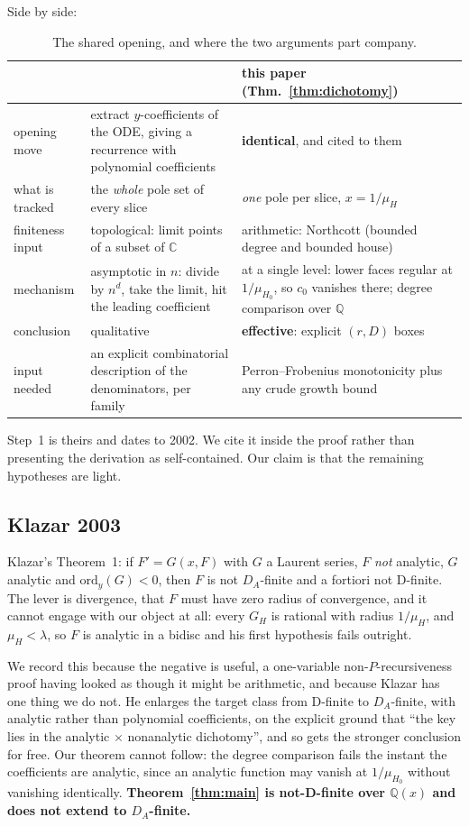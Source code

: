 \documentclass[11pt]{article}
\newcommand{\Q}{\mathbb{Q}}
\newcommand{\C}{\mathbb{C}}
\begin{document}
Side by side:

\begin{table}[H]
\centering\small
\begin{tabular}{p{} p{} p{}}
\toprule
 & \cite[Lemma~9]{bmr2002} & this paper (Thm.~\ref{thm:dichotomy}) \\
\midrule
opening move & extract $y$-coefficients of the ODE, giving a recurrence with polynomial coefficients & \textbf{identical}, and cited to them \\
what is tracked & the \emph{whole} pole set of every slice & \emph{one} pole per slice, $x = 1/\mu_H$ \\
finiteness input & topological: limit points of a subset of $\C$ & arithmetic: Northcott (bounded degree and bounded house) \\
mechanism & asymptotic in $n$: divide by $n^d$, take the limit, hit the leading coefficient & at a single level: lower faces regular at $1/\mu_{H_0}$, so $c_0$ vanishes there; degree comparison over $\Q$ \\
conclusion & qualitative & \textbf{effective}: explicit $(r,D)$ boxes \\
input needed & an explicit combinatorial description of the denominators, per family & Perron--Frobenius monotonicity plus any crude growth bound \\
\bottomrule
\end{tabular}
\caption{The shared opening, and where the two arguments part company.}
\label{tab:sidebyside}
\end{table}

Step~1 is theirs and dates to 2002. We cite it inside the proof rather than
presenting the derivation as self-contained. Our claim is that the remaining
hypotheses are light.

\subsection{Klazar 2003}

Klazar's Theorem~1: if $F' = G(x,F)$ with $G$ a Laurent series, $F$ \emph{not}
analytic, $G$ analytic and $\mathrm{ord}_y(G) < 0$, then $F$ is not $D_A$-finite
and a fortiori not D-finite. The lever is divergence, that $F$ must have zero
radius of convergence, and it cannot engage with our object at all: every
$G_H$ is rational with radius $1/\mu_H$, and $\mu_H < \lambda$, so $F$ is
analytic in a bidisc and his first hypothesis fails outright.

We record this because the negative is useful, a one-variable
non-$P$-recursiveness proof having looked as though it might be arithmetic, and
because Klazar has one thing we do not. He enlarges the target class from
D-finite to $D_A$-finite, with analytic rather than polynomial coefficients, on
the explicit ground that ``the key lies in the analytic $\times$ nonanalytic
dichotomy'', and so gets the stronger conclusion for free. Our theorem cannot follow: the degree comparison fails the instant the
coefficients are analytic, since an analytic function may vanish at
$1/\mu_{H_0}$ without vanishing identically. \textbf{Theorem~\ref{thm:main} is not-D-finite over $\Q(x)$ and does
not extend to $D_A$-finite.}
\end{document}

